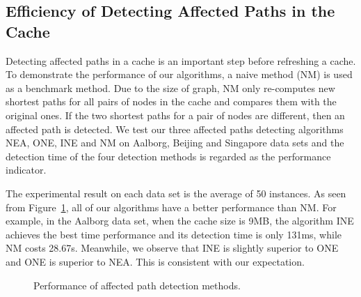 \subsection{Efficiency of Detecting Affected Paths in the Cache}
\label{ssec:efficiency-detecting}
Detecting affected paths in a cache is an important step before refreshing a cache. To demonstrate the performance of our algorithms, a naive method (NM) is used as a benchmark method. Due to the size of graph, NM only re-computes new shortest paths for all pairs of nodes in the cache and compares them with the original ones. If the two shortest paths for a pair of nodes are different, then an affected path is detected.
We test our three affected paths detecting algorithms NEA, ONE, INE and NM on Aalborg, Beijing and Singapore data sets and the detection time of the four detection methods is regarded as the performance indicator.

The experimental result on each data set is the average of 50 instances.
As seen from Figure~\ref{fig:comparison-detecttime}, all of our algorithms have a better performance than NM.
For example, in the Aalborg data set, when the cache size is 9MB, the algorithm INE achieves the best time performance and its detection time is only 131ms, while NM costs 28.67s. Meanwhile, we observe that INE is slightly superior to ONE and ONE is superior to NEA. This is consistent with our expectation.
\begin{figure}[htbp]
\centering
 \caption{Performance of affected path detection methods.}
 \label{fig:comparison-detecttime}
\end{figure}

